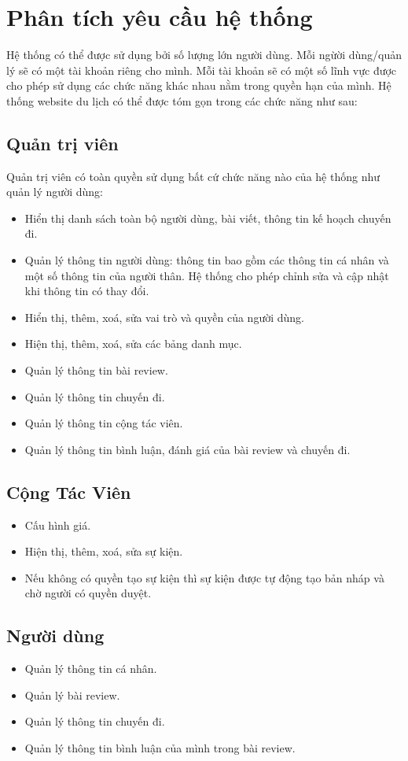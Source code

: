 \section{Phân tích yêu cầu hệ thống}
Hệ thống có thể được sử dụng bởi số lượng lớn người dùng. Mỗi ngừời dùng/quản lý sẽ có một tài khoản riêng cho mình. Mỗi tài khoản sẽ có một số lĩnh vực được cho phép sử dụng các chức năng khác nhau nằm trong quyền hạn của mình. Hệ thống website du lịch có thể được tóm gọn trong các chức năng như sau: 
\subsection{Quản trị viên}
Quản trị viên có toàn quyền sử dụng bất cứ chức năng nào của hệ thống như quản lý người dùng:
\begin{itemize}
    \item Hiển thị danh sách toàn bộ người dùng, bài viết, thông tin kế hoạch chuyến đi. 
    \item Quản lý thông tin người dùng: thông tin bao gồm các thông tin cá nhân và một số thông tin của người thân. Hệ thống cho phép chỉnh sửa và cập nhật khi thông tin có thay đổi.
    \item Hiển thị, thêm, xoá, sửa vai trò và quyền của người dùng.
    \item Hiện thị, thêm, xoá, sửa các bảng danh mục.
    \item Quản lý thông tin bài review.
    \item Quản lý thông tin chuyến đi.
    \item Quản lý thông tin cộng tác viên.
    \item Quản lý thông tin bình luận, đánh giá của bài review và chuyến đi.
\end{itemize}
\subsection{Cộng Tác Viên}
\begin{itemize}
    \item Cấu hình giá.
    \item Hiện thị, thêm, xoá, sửa sự kiện.
    \item Nếu không có quyền tạo sự kiện thì sự kiện được tự động tạo bản nháp và chờ người có quyền duyệt.
    
\end{itemize}
\subsection{Người dùng}
\begin{itemize}
    \item Quản lý thông tin cá nhân.
    \item Quản lý bài review.
    \item Quản lý thông tin chuyến đi.
    \item Quản lý thông tin bình luận của mình trong bài review.
        \subitem 
\end{itemize}
